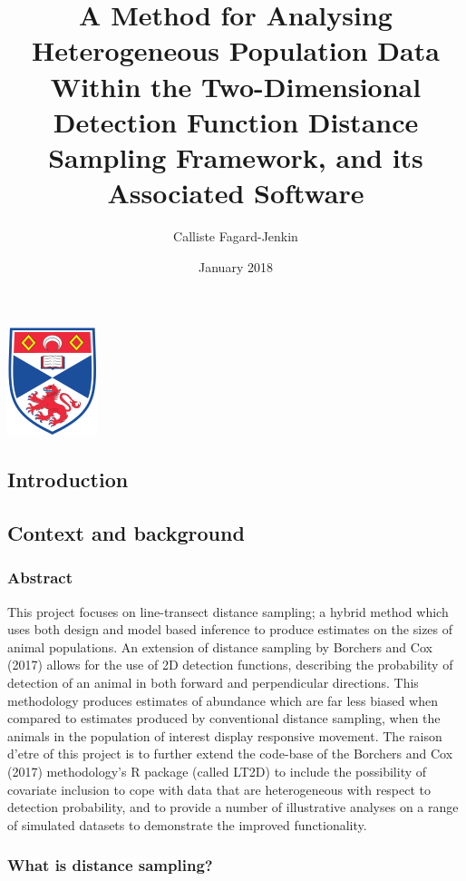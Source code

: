 \documentclass[11pt]{article}
\title{A Method for Analysing Heterogeneous Population Data Within the Two-Dimensional Detection Function Distance Sampling Framework, and its Associated Software}
\date{January 2018}
\author{Calliste Fagard-Jenkin}
\begin{document}
\maketitle
\begin{center}
\includegraphics[scale=1]{Logo}
\end{center}
\newpage
\begin{multicols}{2}
	
\section{Introduction}
\subsection{Context and background}
\subsubsection{Abstract}
This project focuses on line-transect distance sampling; a hybrid method which uses both design and model based inference to produce estimates on the sizes of animal populations. An extension of distance sampling by Borchers and Cox (2017) allows for the use of 2D detection functions, describing the probability of detection of an animal in both forward and perpendicular directions. This methodology produces estimates of abundance which are far less biased when compared to estimates produced by conventional distance sampling, when the animals in the population of interest display responsive movement. The raison d'etre of this project is to further extend the code-base of the Borchers and Cox (2017) methodology's R package (called LT2D) to include the possibility of covariate inclusion to cope with data that are heterogeneous with respect to detection probability, and to provide a number of illustrative analyses on a range of simulated datasets to demonstrate the improved functionality.

\subsubsection{What is distance sampling?}


\end{multicols}
\end{document}
